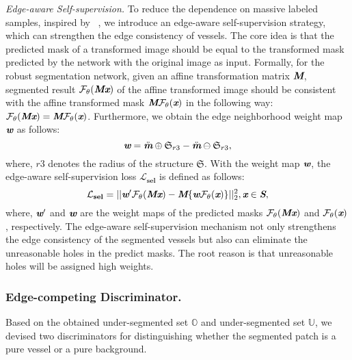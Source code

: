 \documentclass[letterpaper]{article} %
\begin{document}
\emph{Edge-aware Self-supervision.} To reduce the dependence on massive labeled samples,
inspired by ~\citet{wang2019self-supervised}, we introduce an edge-aware self-supervision strategy, which can strengthen the edge consistency of vessels.
The core idea is that the predicted mask of a transformed image should be equal to the transformed mask predicted by the network with the original image as input.
Formally, for the robust segmentation network, given an affine transformation matrix $\textbf{\em M}$, segmented result $\mathcal{F}_{\theta}(\textbf{\em M}\textbf{\em x})$ of the affine transformed image should be consistent with the affine transformed mask  $\textbf{\em M}\mathcal{F}_{\theta}(\textbf{\em x})$ in the following way: $\mathcal{F}_{\theta}(\textbf{\em M}\textbf{\em x})=\textbf{\em M}\mathcal{F}_{\theta}(\textbf{\em x})$. Furthermore, we obtain the edge neighborhood weight map $\textbf{\em w}$ as follows:
\begin{equation}\label{eq2}
\textbf{\em w}=\ddot{\textbf{\em m}} \oplus \mathfrak{S}_{r3} -\ddot{\textbf{\em m}} \ominus \mathfrak{S}_{r3},
\end{equation}
where, $r3$ denotes the radius of the structure $\mathfrak{S}$.
With the weight map $\textbf{\em w}$, the edge-aware self-supervision loss $\mathbf{\mathcal{L}_{sel}}$ is defined as follows:
\begin{equation}\label{eq3}
\mathbf{\mathcal{L}_{sel}}=||\textbf{\em w}'\mathcal{F}_{\theta}(\textbf{\em M}\textbf{\em x})-\textbf{\em M}\{\textbf{\em w}\mathcal{F}_{\theta}(\textbf{\em x})\}||^2_2,
\textbf{\em x} \in \textbf{\em S},
\end{equation}
where, $\textbf{\em w}'$ and $\textbf{\em w}$ are the weight maps of the predicted masks $\mathcal{F}_{\theta}(\textbf{\em M}\textbf{\em x})$ and $\mathcal{F}_{\theta}(\textbf{\em x})$, respectively.
The edge-aware self-supervision mechanism not only strengthens the edge consistency of the segmented vessels but also can eliminate the unreasonable holes in the predict masks. The root reason is that unreasonable holes will be assigned high weights.
\subsubsection{Edge-competing Discriminator.}
Based on the obtained under-segmented set $\mathbb{O}$ and under-segmented set $\mathbb{U}$,
we devised two discriminators for distinguishing whether the segmented patch is a pure vessel or a pure background.
\end{document}
